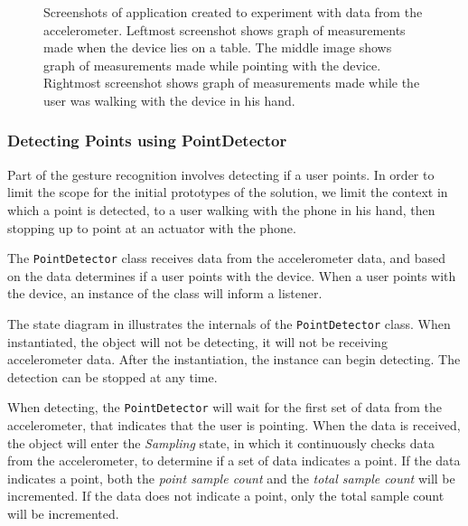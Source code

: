 \begin{figure}[!htb]%
    \centering
    \caption{Screenshots of application created to experiment with data from the accelerometer. Leftmost screenshot shows graph of measurements made when the device lies on a table. The middle image shows graph of measurements made while pointing with the device. Rightmost screenshot shows graph of measurements made while the user was walking with the device in his hand.}
    \label{fig:gesture-recognition:pointer}
\end{figure}

\subsubsection{Detecting Points using PointDetector}

Part of the gesture recognition involves detecting if a user points. 
In order to limit the scope for the initial prototypes of the solution, 
we limit the context in which a point is detected, 
to a user walking with the phone in his hand, 
then stopping up to point at an actuator with the phone.

The \texttt{PointDetector} class receives data from the accelerometer data, 
and based on the data determines if a user points with the device. 
When a user points with the device, 
an instance of the class will inform a listener.

The state diagram in  illustrates the internals of the \texttt{PointDetector} class. 
When instantiated, the object will not be detecting, 
\ie it will not be receiving accelerometer data. 
After the instantiation, the instance can begin detecting. 
The detection can be stopped at any time.

When detecting, the \texttt{PointDetector} will wait for the first set of data from the accelerometer, 
that indicates that the user is pointing. 
When the data is received, 
the object will enter the \textit{Sampling} state, 
in which it continuously checks data from the accelerometer, 
to determine if a set of data indicates a point. 
If the data indicates a point, 
both the \emph{point sample count} and the \emph{total sample count} will be incremented. 
If the data does not indicate a point, 
only the total sample count will be incremented.

